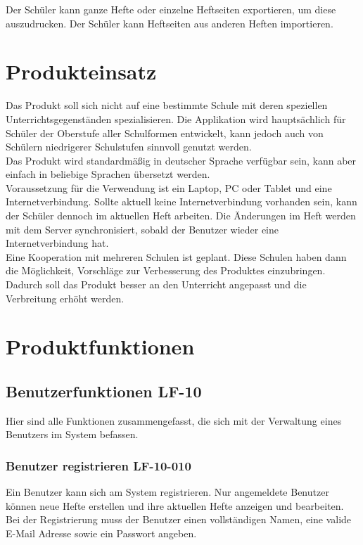 \documentclass[12pt,a4paper,oneside,ngerman]{scrartcl}
\begin{document}
Der Schüler kann ganze Hefte oder einzelne Heftseiten exportieren, um diese auszudrucken. Der Schüler kann Heftseiten aus anderen Heften importieren.


\section{Produkteinsatz}
Das Produkt soll sich nicht auf eine bestimmte Schule mit deren speziellen Unterrichtsgegenständen spezialisieren. Die Applikation wird hauptsächlich für Schüler der Oberstufe aller Schulformen entwickelt, kann jedoch auch von Schülern niedrigerer Schulstufen sinnvoll genutzt werden.\\

Das Produkt wird standardmäßig in deutscher Sprache verfügbar sein, kann aber einfach in beliebige Sprachen übersetzt werden.\\

Voraussetzung für die Verwendung ist ein Laptop, PC oder Tablet und eine Internetverbindung. Sollte aktuell keine Internetverbindung vorhanden sein, kann der Schüler dennoch im aktuellen Heft arbeiten. Die Änderungen im Heft werden mit dem Server synchronisiert, sobald der Benutzer wieder eine Internetverbindung hat.\\

Eine Kooperation mit mehreren Schulen ist geplant. Diese Schulen haben dann die Möglichkeit, Vorschläge zur Verbesserung des Produktes einzubringen. Dadurch soll das Produkt besser an den Unterricht angepasst und die Verbreitung erhöht werden.

\section{Produktfunktionen}
\subsection[Benutzerfunktionen]{Benutzerfunktionen \hfill LF-10}
Hier sind alle Funktionen zusammengefasst, die sich mit der Verwaltung eines Benutzers im System befassen.
\subsubsection{Benutzer registrieren \hfill LF-10-010}
Ein Benutzer kann sich am System registrieren. Nur angemeldete Benutzer können neue Hefte erstellen und ihre aktuellen Hefte anzeigen und bearbeiten. Bei der Registrierung muss der Benutzer einen vollständigen Namen, eine valide E-Mail Adresse sowie ein Passwort angeben.
\end{document}
